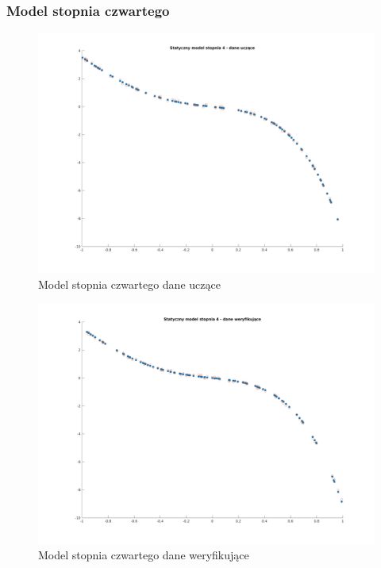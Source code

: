 \documentclass[a4paper, 11pt]{article}
\begin{document}
\subsubsection{Model stopnia czwartego}
\begin{figure}[H]
\centering
\includegraphics[scale=0.50]{dane_stat_4_ucz.png}
\caption{Model stopnia czwartego dane uczące}
\label{}
\end{figure}
\begin{figure}[H]
\centering
\includegraphics[scale=0.50]{dane_stat_4_wer.png}
\caption{Model stopnia czwartego dane weryfikujące}
\label{}
\end{figure}
\end{document}
